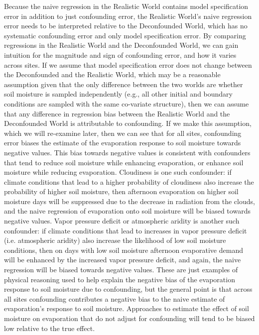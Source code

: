 Because the naive regression in the Realistic World contains model
specification error in addition to just confounding error, the
Realistic World's naive regression error needs to be interpreted
relative to the Deconfounded World, which has no systematic
confounding error and only model specification error. By comparing
regressions in the Realistic World and the Deconfounded World, we can
gain intuition for the magnitude and sign of confounding error, and
how it varies across sites. If we assume that model specification
error does not change between the Deconfounded and the Realistic
World, which may be a reasonable assumption given that the only
difference between the two worlds are whether soil moisture is sampled
independently (e.g., all other initial and boundary conditions are
sampled with the same co-variate structure), then we can assume that
any difference in regression bias between the Realistic World and the
Deconfounded World is attributable to confounding. If we make this
assumption, which we will re-examine later, then we can see that for
all sites, confounding error biases the estimate of the evaporation
response to soil moisture towards negative values. This bias towards
negative values is consistent with confounders that tend to reduce
soil moisture while enhancing evaporation, or enhance soil moisture
while reducing evaporation. Cloudiness is one such confounder: if
climate conditions that lead to a higher probability of cloudiness
also increase the probability of higher soil moisture, then afternoon
evaporation on higher soil moisture days will be suppressed due to the
decrease in radiation from the clouds, and the naive regression of
evaporation onto soil moisture will be biased towards negative
values. Vapor pressure deficit or atmospheric aridity is another such
confounder: if climate conditions that lead to increases in vapor
pressure deficit (i.e. atmospheric aridity) also increase the
likelihood of low soil moisture conditions, then on days with low soil
moisture afternoon evaporative demand will be enhanced by the
increased vapor pressure deficit, and again, the naive regression will
be biased towards negative values. These are just examples of physical
reasoning used to help explain the negative bias of the evaporation
response to soil moisture due to confounding, but the general point is
that across all sites confounding contributes a negative bias to the
naive estimate of evaporation's response to soil moisture. Approaches
to estimate the effect of soil moisture on evaporation that do not
adjust for confounding will tend to be biased low relative to the true
effect.

